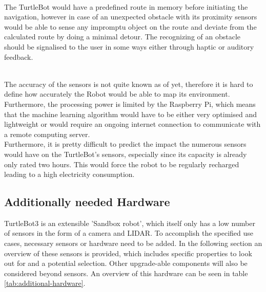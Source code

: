 \documentclass[plainarticle,zihtitle,english,final,hyperref,utf8]{zihpub}
\begin{document}
\\
\newline
The TurtleBot would have a predefined route in memory before initiating the navigation, however in case of an unexpected obstacle with its proximity sensors would be able to sense any impromptu object on the route and deviate from the calculated route by doing a minimal detour. The recognizing of an obstacle should be signalised to the user in some ways either through haptic or auditory feedback. \\
\newline

\\
\newline
The accuracy of the sensors is not quite known as of yet, therefore it is hard to define how accurately the Robot would be able to map its environment. Furthermore, the processing power is limited by the Raspberry Pi, which means that the machine learning algorithm would have to be either very optimised and lightweight or would require an ongoing internet connection to communicate with a remote computing server.\\
\newline
Furthermore, it is pretty difficult to predict the impact the numerous sensors would have on the TurtleBot’s sensors, especially since its capacity is already only rated two hours. This would force the robot to be regularly recharged leading to a high electricity consumption. 


\newpage
\subsection{Additionally needed Hardware}
\label{sec:sensors}
TurtleBot3 is an extensible 'Sandbox robot', which itself only has a low number of sensors in the form of a camera and LIDAR. To accomplish the specified use cases, necessary sensors or hardware need to be added. In the following section an overview of these sensors is provided, which includes specific properties to look out for and a potential selection. Other upgrade-able components will also be considered beyond sensors. An overview of this hardware can be seen in table \ref{tab:additional-hardware}.
\end{document}
